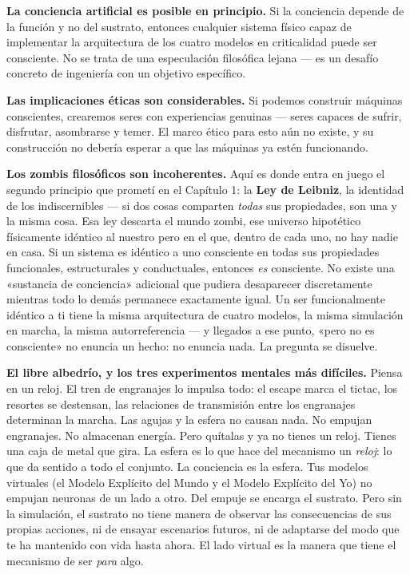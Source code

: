 \documentclass[11pt, twoside, openright]{book}
\begin{document}
\textbf{La conciencia artificial es posible en principio.} Si la conciencia depende de la función y no del sustrato, entonces cualquier sistema físico capaz de implementar la arquitectura de los cuatro modelos en criticalidad puede ser consciente. No se trata de una especulación filosófica lejana --- es un desafío concreto de ingeniería con un objetivo específico.

\textbf{Las implicaciones éticas son considerables.} Si podemos construir máquinas conscientes, crearemos seres con experiencias genuinas --- seres capaces de sufrir, disfrutar, asombrarse y temer. El marco ético para esto aún no existe, y su construcción no debería esperar a que las máquinas ya estén funcionando.

\textbf{Los zombis filosóficos son incoherentes.} Aquí es donde entra en juego el segundo principio que prometí en el Capítulo 1: la \textbf{Ley de Leibniz}, la identidad de los indiscernibles --- si dos cosas comparten \textit{todas} sus propiedades, son una y la misma cosa. Esa ley descarta el mundo zombi, ese universo hipotético físicamente idéntico al nuestro pero en el que, dentro de cada uno, no hay nadie en casa. Si un sistema es idéntico a uno consciente en todas sus propiedades funcionales, estructurales y conductuales, entonces \textit{es} consciente. No existe una «sustancia de conciencia» adicional que pudiera desaparecer discretamente mientras todo lo demás permanece exactamente igual. Un ser funcionalmente idéntico a ti tiene la misma arquitectura de cuatro modelos, la misma simulación en marcha, la misma autorreferencia --- y llegados a ese punto, «pero no es consciente» no enuncia un hecho: no enuncia nada. La pregunta se disuelve.

\textbf{El libre albedrío, y los tres experimentos mentales más difíciles.} Piensa en un reloj. El tren de engranajes lo impulsa todo: el escape marca el tictac, los resortes se destensan, las relaciones de transmisión entre los engranajes determinan la marcha. Las agujas y la esfera no causan nada. No empujan engranajes. No almacenan energía. Pero quítalas y ya no tienes un reloj. Tienes una caja de metal que gira. La esfera es lo que hace del mecanismo un \textit{reloj}: lo que da sentido a todo el conjunto. La conciencia es la esfera. Tus modelos virtuales (el Modelo Explícito del Mundo y el Modelo Explícito del Yo) no empujan neuronas de un lado a otro. Del empuje se encarga el sustrato. Pero sin la simulación, el sustrato no tiene manera de observar las consecuencias de sus propias acciones, ni de ensayar escenarios futuros, ni de adaptarse del modo que te ha mantenido con vida hasta ahora. El lado virtual es la manera que tiene el mecanismo de ser \textit{para} algo.
\end{document}
